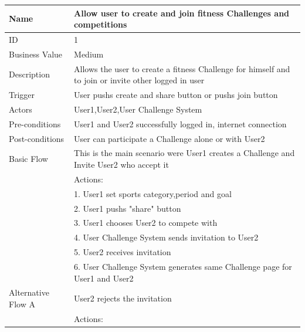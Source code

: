 \documentclass{article}
\begin{document}
\begin{table}[h!]
    \begin{tabularx}{\textwidth}{|>{\raggedright\arraybackslash}p{}|X|}
        \hline
        Name             & Allow user to create and join fitness Challenges and competitions                               \\ \hline
        ID               & 1                                                                                   \\ \hline
        Business Value   & Medium                                                                                  \\ \hline
        Description      & Allows the user to create a fitness Challenge for himself and to join or invite other logged in user\\ \hline
        Trigger          & User pushs create and share button or pushs join button \\ \hline
        Actors           & User1,User2,User Challenge System                        \\ \hline
        Pre-conditions   & User1 and User2 successfully logged in, internet connection                                  \\ \hline
        Post-conditions  & User can participate a Challenge alone or with User2                                                        \\ \hline
        Basic Flow       & This is the main scenario were User1 creates a Challenge and Invite User2 who accept it\\ \hline
                         & Actions: \\
                         & 1. User1 set sports category,period and goal\\
                         & 2. User1 pushs "share" button \\
                         & 3. User1 chooses User2 to compete with\\
                         & 4. User Challenge System sends invitation to User2 \\
                         & 5. User2 receives invitation\\
                         & 6. User Challenge System generates same Challenge page for User1 and User2 \\ \hline
        Alternative Flow A & User2 rejects the invitation\\
                         & Actions: \\

\end{tabularx}
\end{table}
\end{document}
